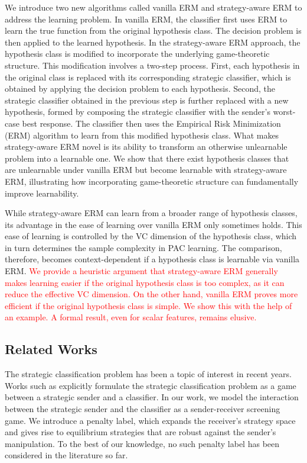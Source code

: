 We introduce two new algorithms called vanilla ERM and strategy-aware ERM to address the learning problem. In vanilla ERM, the classifier first uses ERM to learn the true function from the original hypothesis class. The decision problem is then applied to the learned hypothesis. In the strategy-aware ERM approach, the hypothesis class is modified to incorporate the underlying game-theoretic structure. This modification involves a two-step process. First, each hypothesis in the original class is replaced with its corresponding strategic classifier, which is obtained by applying the decision problem to each hypothesis. Second, the strategic classifier obtained in the previous step is further replaced with a new hypothesis, formed by composing the strategic classifier with the sender’s worst-case best response. The classifier then uses the Empirical Risk Minimization (ERM) algorithm to learn from this modified hypothesis class. What makes strategy-aware ERM novel is its ability to transform an otherwise unlearnable problem into a learnable one. We show that there exist hypothesis classes that are unlearnable under vanilla ERM but become learnable with strategy-aware ERM, illustrating how incorporating game-theoretic structure can fundamentally improve learnability.

While strategy-aware ERM can learn from a broader range of hypothesis classes, its advantage in the ease of learning over vanilla ERM only sometimes holds. This ease of learning is controlled by the VC dimension of the hypothesis class, which in turn determines the sample complexity in PAC learning. The comparison, therefore, becomes context-dependent if a hypothesis class is learnable via vanilla ERM. \textcolor{red}{We provide a heuristic argument that strategy-aware ERM generally makes learning easier if the original hypothesis class is too complex, as it can reduce the effective VC dimension. On the other hand, vanilla ERM proves more efficient if the original hypothesis class is simple. We show this with the help of an example. A formal result, even for scalar features, remains elusive.}


\subsection{Related Works}
The strategic classification problem has been a topic of interest in recent years. Works such as \cite{bruckner2011stackelberg,ghalme2021strategic,bechavod2022information,cohen2024bayesian,jagadeesan2021alternative,dalvi2004adversarial} explicitly formulate the strategic classification problem as a game between a strategic sender and a classifier. In our work, we model the interaction between the strategic sender and the classifier as a sender-receiver screening game. We introduce a penalty label, which expands the receiver's strategy space and gives rise to equilibrium strategies that are robust against the sender's manipulation. To the best of our knowledge, no such penalty label has been considered in the literature so far.

